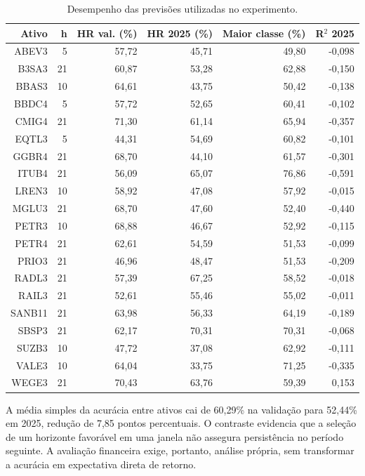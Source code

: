 \begin{table}[H]
\centering
\caption{Desempenho das previsões utilizadas no experimento.}
{\footnotesize
\begin{tabular}{@{}rrrrrr@{}}
\hline
Ativo & h & HR val. (\%) & HR 2025 (\%) & Maior classe (\%) & R$^{2}$ 2025 \\ \hline
ABEV3 & 5 & 57,72 & 45,71 & 49,80 & -0,098 \\
B3SA3 & 21 & 60,87 & 53,28 & 62,88 & -0,150 \\
BBAS3 & 10 & 64,61 & 43,75 & 50,42 & -0,138 \\
BBDC4 & 5 & 57,72 & 52,65 & 60,41 & -0,102 \\
CMIG4 & 21 & 71,30 & 61,14 & 65,94 & -0,357 \\
EQTL3 & 5 & 44,31 & 54,69 & 60,82 & -0,101 \\
GGBR4 & 21 & 68,70 & 44,10 & 61,57 & -0,301 \\
ITUB4 & 21 & 56,09 & 65,07 & 76,86 & -0,591 \\
LREN3 & 10 & 58,92 & 47,08 & 57,92 & -0,015 \\
MGLU3 & 21 & 68,70 & 47,60 & 52,40 & -0,440 \\
PETR3 & 10 & 68,88 & 46,67 & 52,92 & -0,115 \\
PETR4 & 21 & 62,61 & 54,59 & 51,53 & -0,099 \\
PRIO3 & 21 & 46,96 & 48,47 & 51,53 & -0,209 \\
RADL3 & 21 & 57,39 & 67,25 & 58,52 & -0,018 \\
RAIL3 & 21 & 52,61 & 55,46 & 55,02 & -0,011 \\
SANB11 & 21 & 63,98 & 56,33 & 64,19 & -0,189 \\
SBSP3 & 21 & 62,17 & 70,31 & 70,31 & -0,068 \\
SUZB3 & 10 & 47,72 & 37,08 & 62,92 & -0,111 \\
VALE3 & 10 & 64,04 & 33,75 & 71,25 & -0,335 \\
WEGE3 & 21 & 70,43 & 63,76 & 59,39 & 0,153 \\
\hline
\end{tabular}}
\par{}
\end{table}
A média simples da acurácia entre ativos cai de 60,29\% na validação para 52,44\% em 2025, redução de 7,85 pontos percentuais. O contraste evidencia que a seleção de um horizonte favorável em uma janela não assegura persistência no período seguinte. A avaliação financeira exige, portanto, análise própria, sem transformar a acurácia em expectativa direta de retorno.

